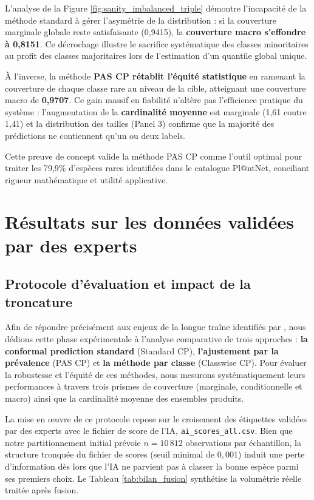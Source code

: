 \documentclass[12pt,a4paper]{article}
\begin{document}
L'analyse de la Figure \ref{fig:sanity_imbalanced_triple} démontre l'incapacité de la méthode standard à gérer l'asymétrie de la distribution : si la couverture marginale globale reste satisfaisante (0,9415), la \textbf{couverture macro s'effondre à 0,8151}. Ce décrochage illustre le sacrifice systématique des classes minoritaires au profit des classes majoritaires lors de l'estimation d'un quantile global unique. 

À l'inverse, la méthode \textbf{PAS CP rétablit l'équité statistique} en ramenant la couverture de chaque classe rare au niveau de la cible, atteignant une couverture macro de \textbf{0,9707}. Ce gain massif en fiabilité n'altère pas l'efficience pratique du système : l'augmentation de la \textbf{cardinalité moyenne} est marginale (1,61 contre 1,41) et la distribution des tailles (Panel 3) confirme que la majorité des prédictions ne contiennent qu'un ou deux labels.

Cette preuve de concept valide la méthode PAS CP comme l'outil optimal pour traiter les 79,9\% d'espèces rares identifiées dans le catalogue Pl@ntNet, conciliant rigueur mathématique et utilité applicative.





\section{Résultats sur les données validées par des experts }

\subsection{Protocole d'évaluation et impact de la troncature}

Afin de répondre précisément aux enjeux de la \og longue traîne \fg{} identifiés par \cite{Ding2025}, nous dédions cette phase expérimentale à l'analyse comparative de trois approches : \textbf{la conformal prediction standard} (Standard CP), \textbf{l'ajustement par la prévalence} (PAS CP) et \textbf{la méthode par classe} (Classwise CP). Pour évaluer la robustesse et l'équité de ces méthodes, nous mesurons systématiquement leurs performances à travers trois prismes de couverture (marginale, conditionnelle et macro) ainsi que la cardinalité moyenne des ensembles produits.

La mise en œuvre de ce protocole repose sur le croisement des étiquettes validées par des experts avec le fichier de score de l'IA, \texttt{ai\_scores\_all.csv}. Bien que notre partitionnement initial prévoie $n = 10\,812$ observations par échantillon, la structure tronquée du fichier de scores (seuil minimal de $0{,}001$) induit une perte d'information dès lors que l'IA ne parvient pas à classer la bonne espèce parmi ses premiers choix. Le Tableau \ref{tab:bilan_fusion} synthétise la volumétrie réelle traitée après fusion.
\end{document}

